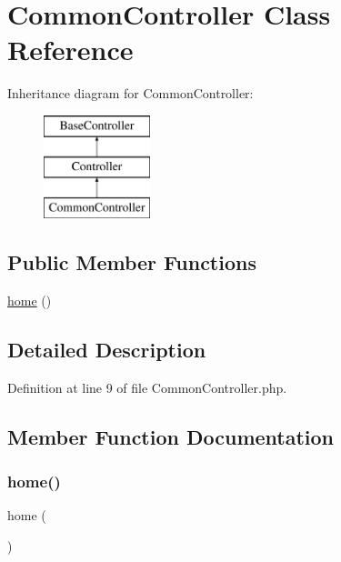 \hypertarget{class_responsive_1_1_http_1_1_controllers_1_1_common_controller}{}\section{Common\+Controller Class Reference}
\label{class_responsive_1_1_http_1_1_controllers_1_1_common_controller}
Inheritance diagram for Common\+Controller\+:\begin{figure}[H]
\begin{center}
\leavevmode
\includegraphics[height=3.000000cm]{class_responsive_1_1_http_1_1_controllers_1_1_common_controller}
\end{center}
\end{figure}
\subsection*{Public Member Functions}
\begin{DoxyCompactItemize}
\item 
\mbox{\hyperlink{class_responsive_1_1_http_1_1_controllers_1_1_common_controller_a174b8e4c7d4d7363c6f773671defdeff}{home}} ()
\end{DoxyCompactItemize}


\subsection{Detailed Description}


Definition at line 9 of file Common\+Controller.\+php.



\subsection{Member Function Documentation}
\mbox{\label{class_responsive_1_1_http_1_1_controllers_1_1_common_controller_a174b8e4c7d4d7363c6f773671defdeff}} 
\subsubsection{\texorpdfstring{home()}{home()}}
{\footnotesize\ttfamily home (\begin{DoxyParamCaption}{ }\end{DoxyParamCaption})}

